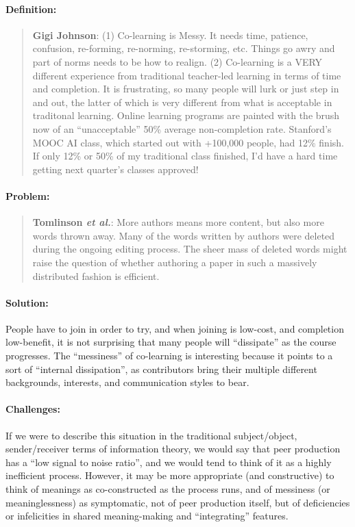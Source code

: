 \paragraph{Definition:}

\begin{quote}
\textbf{Gigi Johnson}: (1) Co-learning is Messy. It needs time, patience,
confusion, re-forming, re-norming, re-storming, etc. Things go awry and
part of norms needs to be how to realign. (2) Co-learning is a VERY
different experience from traditional teacher-led learning in terms of
time and completion. It is frustrating, so many people will lurk or just
step in and out, the latter of which is very different from what is
acceptable in traditonal learning. Online learning programs are painted
with the brush now of an ``unacceptable'' 50\% average non-completion
rate. Stanford's MOOC AI class, which started out with +100,000 people,
had 12\% finish. If only 12\% or 50\% of my traditional class finished,
I'd have a hard time getting next quarter's classes approved!
\end{quote}

\paragraph{Problem:}

\begin{quote}
\textbf{Tomlinson \emph{et al.}}: More authors means more content, but
also more words thrown away. Many of the words written by authors were
deleted during the ongoing editing process. The sheer mass of deleted
words might raise the question of whether authoring a paper in such a
massively distributed fashion is efficient.
\end{quote}

\paragraph{Solution:} People have to join in order to try, and when joining
is low-cost, and completion low-benefit, it is not surprising that many
people will ``dissipate'' as the course progresses. The ``messiness'' of
co-learning is interesting because it points to a sort of ``internal
dissipation'', as contributors bring their multiple different
backgrounds, interests, and communication styles to bear.

\paragraph{Challenges:} If we were to describe this situation in the
traditional subject/object, sender/receiver terms of information theory,
we would say that peer production has a ``low signal to noise ratio'',
and we would tend to think of it as a highly inefficient process.
However, it may be more appropriate (and constructive) to think of
meanings as co-constructed as the process runs, and of messiness (or
meaninglessness) as symptomatic, not of peer production itself, but of
deficiencies or infelicities in shared meaning-making and
``integrating'' features.

